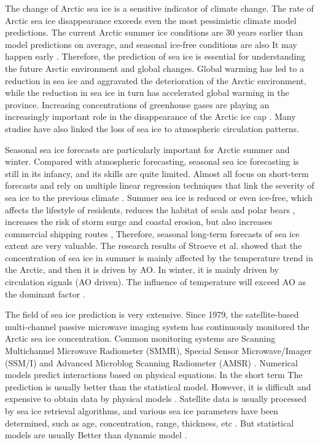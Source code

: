 
The change of Arctic sea ice is a sensitive indicator of climate change. The rate of Arctic sea ice disappearance exceeds even the most pessimistic climate model predictions. The current Arctic summer ice conditions are 30 years earlier than model predictions on average, and seasonal ice-free conditions are also It may happen early \cite{stroeve_frei_mccreight_ghatak_2008}. Therefore, the prediction of sea ice is essential for understanding the future Arctic environment and global changes. Global warming has led to a reduction in sea ice and aggravated the deterioration of the Arctic environment, while the reduction in sea ice in turn has accelerated global warming in the province. Increasing concentrations of greenhouse gases are playing an increasingly important role in the disappearance of the Arctic ice cap \cite{kim2019satellite}. Many studies have also linked the loss of sea ice to atmospheric circulation patterns.

Seasonal sea ice forecasts are particularly important for Arctic summer and winter. Compared with atmospheric forecasting, seasonal sea ice forecasting is still in its infancy, and its skills are quite limited. Almost all focus on short-term forecasts and rely on multiple linear regression techniques that link the severity of sea ice to the previous climate \cite{tivy2011origins}. Summer sea ice is reduced or even ice-free, which affects the lifestyle of residents, reduces the habitat of seals and polar bears \cite{drobot2002practical}, increases the risk of storm surge and coastal erosion, but also increases commercial shipping routes \cite{drobot2006long}, Therefore, seasonal long-term forecasts of sea ice extent are very valuable. The research results of Stroeve et al. showed that the concentration of sea ice in summer is mainly affected by the temperature trend in the Arctic, and then it is driven by AO. In winter, it is mainly driven by circulation signals (AO driven). The influence of temperature will exceed AO as the dominant factor \cite{stroeve_frei_mccreight_ghatak_2008}.

The field of sea ice prediction is very extensive. Since 1979, the satellite-based multi-channel passive microwave imaging system has continuously monitored the Arctic sea ice concentration. Common monitoring systems are Scanning Multichannel Microwave Radiometer (SMMR), Special Sensor Microwave/Imager (SSM/I) and Advanced Microblog Scanning Radiometer (AMSR) \cite{fennig2020fundamental}. Numerical models predict interactions based on physical equations. In the short term The prediction is usually better than the statistical model. However, it is difficult and expensive to obtain data by physical models \cite{chi2017prediction}. Satellite data is usually processed by sea ice retrieval algorithms, and various sea ice parameters have been determined, such as age, concentration, range, thickness, etc \cite{chi2017prediction}. But statistical models are usually Better than dynamic model \cite{tivy2011origins}.

